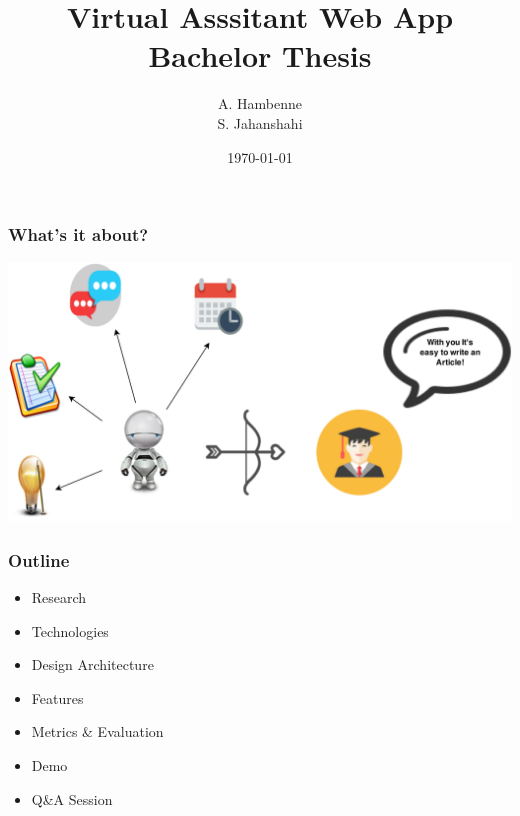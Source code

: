 \documentclass{beamer}
\title[BEP]{Virtual Asssitant Web App\\ \small{Bachelor Thesis}}
\institute[TU Delft]{Delft University of Technology}
\author{A. Hambenne\\
S. Jahanshahi}
\date{\today}
\begin{document}
{
%
\frame{\titlepage}
}

{
}




\begin{frame}
\frametitle{What's it about?}
\centering
\includegraphics[scale=0.16]{./images/va.png}
\end{frame}

\begin{frame}\frametitle{Outline}
	\begin{itemize}
		\item Research 
		\item Technologies
		\item Design Architecture
		\item Features
		\item Metrics  \& Evaluation
		\item Demo
		\item Q\&A Session
	\end{itemize}
\end{frame}
\end{document}
